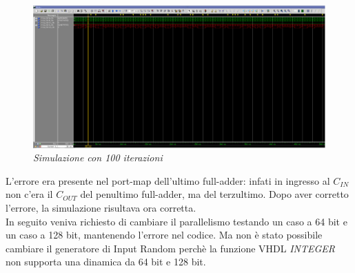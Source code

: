 \begin{figure}[!htb]
	\centering
	\includegraphics[scale=0.2]{immagini/5_1_2}
	\caption{\textit{Simulazione con 100 iterazioni}}
	\label{5_1_2}
\end{figure}
L'errore era presente nel port-map dell'ultimo full-adder: infati in ingresso al $C_{IN}$ non c'era il $C_{OUT}$ del penultimo full-adder, ma del terzultimo.
Dopo aver corretto l'errore, la simulazione risultava ora corretta.\\
In seguito veniva richiesto di cambiare il parallelismo testando un caso a 64 bit e un caso a 128 bit, mantenendo l'errore nel codice. Ma non è stato possibile cambiare il generatore di Input Random perchè la funzione VHDL \textit{INTEGER} non supporta una dinamica da 64 bit e 128 bit. 
